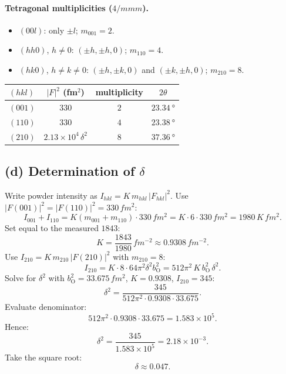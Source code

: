 \documentclass[11pt]{article}
\begin{document}
\paragraph{Tetragonal multiplicities ($4/mmm$).}
\begin{itemize}
\item $(00l)$: only $\pm l$; $m_{001}=2$.
\item $(hh0)$, $h\ne0$: $(\pm h,\pm h,0)$; $m_{110}=4$.
\item $(hk0)$, $h\ne k\ne0$: $(\pm h,\pm k,0)$ and $(\pm k,\pm h,0)$; $m_{210}=8$.
\end{itemize}

\begin{center}
\begin{tabular}{lccc}
\toprule
$(hkl)$ & $|F|^{2}$ (fm$^{2}$) & multiplicity & $2\theta$\\
\midrule
$(001)$ & $330$ & $2$ & $\SI{23.34}{\degree}$\\
$(110)$ & $330$ & $4$ & $\SI{23.38}{\degree}$\\
$(210)$ & $2.13\times 10^{4}\,\delta^{2}$ & $8$ & $\SI{37.36}{\degree}$\\
\bottomrule
\end{tabular}
\end{center}

\subsection*{(d) Determination of $\delta$}

Write powder intensity as $I_{hkl}=K\,m_{hkl}\,|F_{hkl}|^{2}$. Use $|F(001)|^{2}=|F(110)|^{2}=330\,\si{fm^2}$:
\begin{equation}
I_{001}+I_{110}=K(m_{001}+m_{110})\cdot 330\,\si{fm^2}=K\cdot 6\cdot 330\,\si{fm^2}=1980\,K\,\si{fm^2}.
\label{eq:I-sum}
\end{equation}
Set equal to the measured $1843$:
\begin{equation}
K=\frac{1843}{1980}\,\si{fm^{-2}}\approx 0.9308\,\si{fm^{-2}}.
\label{eq:K-value}
\end{equation}
Use $I_{210}=K\,m_{210}\,|F(210)|^{2}$ with $m_{210}=8$:
\begin{equation}
I_{210}=K\cdot 8\cdot 64\pi^{2}\delta^{2}b_{\mathrm{O}}^{2}=512\pi^{2}\,K\,b_{\mathrm{O}}^{2}\,\delta^{2}.
\label{eq:I210}
\end{equation}
Solve for $\delta^{2}$ with $b_{\mathrm{O}}^{2}=33.675\,\si{fm^2}$, $K=0.9308$, $I_{210}=345$:
\begin{equation}
\delta^{2}=\frac{345}{512\pi^{2}\cdot 0.9308\cdot 33.675}.
\end{equation}
Evaluate denominator:
\begin{equation}
512\pi^{2}\cdot 0.9308\cdot 33.675=1.583\times 10^{5}.
\end{equation}
Hence:
\begin{equation}
\delta^{2}=\frac{345}{1.583\times 10^{5}}=2.18\times 10^{-3}.
\end{equation}
Take the square root:
\begin{equation}
\boxed{\,\delta\approx 0.047.\,}
\label{eq:delta-value}
\end{equation}
\end{document}

